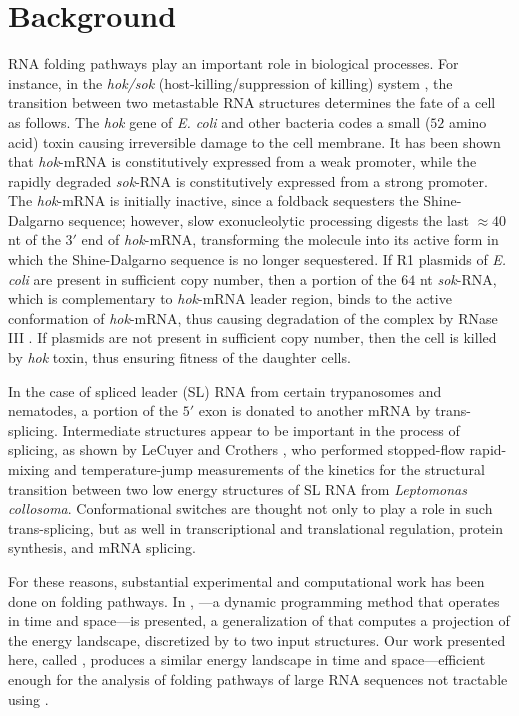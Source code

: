 \section{Background}
\label{sec:ffttwo:bkgrnd}

RNA folding pathways play an important role in biological processes.
For instance, in the {\em hok/sok}
(host-killing/suppression of killing) system \citep{gerdes.arg97},
the transition between two metastable RNA structures determines the
fate of a cell as follows.
The {\em hok} gene of {\em E. coli} and other bacteria
codes a small ($52$ amino acid) toxin causing irreversible damage to the cell
membrane. It has been shown that {\em hok}-mRNA is
constitutively expressed from a weak promoter, while
the rapidly degraded {\em sok}-RNA is constitutively expressed from
a strong promoter.  The {\em hok}-mRNA is initially
inactive, since a foldback sequesters the
Shine-Dalgarno sequence; however, slow exonucleolytic processing
digests the last $\approx 40$ nt of the $3'$ end of {\em hok}-mRNA,
transforming the molecule into its active form in which
the Shine-Dalgarno sequence is no longer sequestered.
If R1 plasmids of {\em E. coli} are present in
sufficient copy number, then a portion of the $64$ nt
{\em sok}-RNA, which is complementary to {\em hok}-mRNA leader
region, binds to the active conformation of {\em hok}-mRNA, thus
causing degradation of the complex by RNase III \citep{gerdes.arg97}.
If plasmids are not present in sufficient copy number, then the
cell is killed by {\em hok} toxin, thus ensuring fitness of the daughter
cells.

In the case of spliced leader (SL) RNA from certain trypanosomes and nematodes,
a portion of the $5'$ exon is donated to
another mRNA by trans-splicing.
Intermediate structures appear to be important in the process of splicing,
as shown by LeCuyer and Crothers \citep{lecuyercrothers}, who performed
stopped-flow rapid-mixing and temperature-jump measurements
of the kinetics for the structural transition between two low
energy structures of SL RNA from {\em Leptomonas collosoma}.
Conformational switches are thought not only to play a role in such
trans-splicing, but as well in transcriptional and
translational regulation, protein synthesis, and mRNA splicing.

For these reasons, substantial experimental and computational work
has been done on folding pathways. In \citep{lorenz}, \rnatwofold---a dynamic
programming method that operates in
 time and  space---is presented, a generalization of \rnabor
\citep{freyhult.b07} that computes a \twoD projection of the energy landscape,
discretized by \bpd to two input structures. Our work presented
here, called \ffttwo, produces a similar energy landscape in  time and
 space---efficient enough for the analysis of folding pathways of large
RNA sequences not tractable using \rnatwofold.

